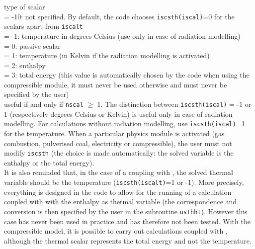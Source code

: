 {type of scalar\\
\hspace*{1.3cm}= -10: not specified. By default, the code chooses
{\tt iscsth(iscal)}=0 for the scalars apart from {\tt iscalt}\\
\hspace*{1.3cm}= -1: temperature in degrees Celsius (use only in case of
radiation modelling)\\
\hspace*{1.3cm}= 0: passive scalar\\
\hspace*{1.3cm}= 1: temperature (in Kelvin if the radiation modelling is
activated)\\
\hspace*{1.3cm}= 2: enthalpy\\
\hspace*{1.3cm}= 3: total energy (this value is automatically chosen by the code
when using the compressible module, it must never be used otherwise and must
never be specified by the user)\\
useful if and only if {\tt nscal} $\geqslant$ 1. The distinction between
{\tt iscsth(iscal)} = -1 or 1 (respectively degrees Celsius or Kelvin) is
useful only in case of radiation modelling. For calculations without
radiation modelling, use {\tt iscsth(iscal)}=1 for the temperature. When a
particular physics module is activated (gas combustion, pulverised coal,
electricity or compressible), the user must not modify {\tt iscsth} (the choice
is made automatically: the solved variable is the enthalpy or the total energy).\\
It is also reminded that, in the case of a coupling with
\syrthes, the solved thermal variable should be the temperature
({\tt iscsth(iscalt)}=1 or -1).
More precisely, everything is designed in the code to allow for the
running of a calculation coupled with \syrthes with the enthalpy as thermal
variable (the correspondence and conversion is then specified by the user in
the subroutine \texttt{usthht}).
However this case has never been used in practice and has therefore not been
tested. With the compressible model, it is possible to carry out calculations
coupled with \syrthes, although the thermal scalar represents the total
energy and not the temperature.}

